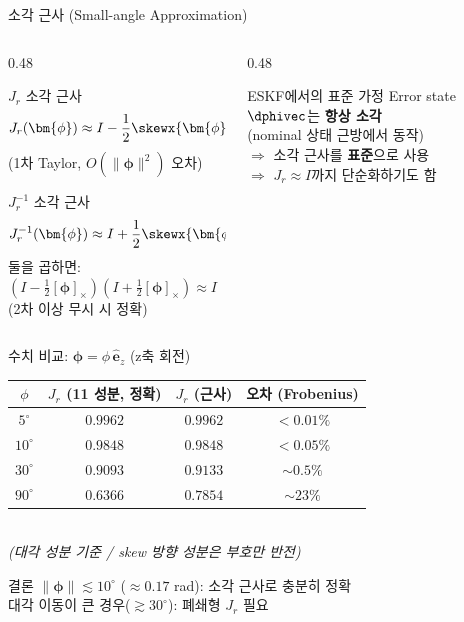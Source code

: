 \begin{frame}[shrink=25]{소각 근사 (Small-angle Approximation)}
  \begin{columns}[T]
    \begin{column}{0.48\textwidth}
      \begin{block}{$J_r$ 소각 근사}
        \[
          J_r(\bm{\phi}) \approx I - \frac{1}{2}\skewx{\bm{\phi}}
        \]
        (1차 Taylor, $O(\|\bm{\phi}\|^2)$ 오차)
      \end{block}
      \begin{block}{$J_r^{-1}$ 소각 근사}
        \[
          J_r^{-1}(\bm{\phi}) \approx I + \frac{1}{2}\skewx{\bm{\phi}}
        \]
        둘을 곱하면: $(I - \tfrac{1}{2}[\bm{\phi}]_\times)(I + \tfrac{1}{2}[\bm{\phi}]_\times) \approx I$\\
        (2차 이상 무시 시 정확)
      \end{block}
    \end{column}
    \begin{column}{0.48\textwidth}
      \begin{alertblock}{ESKF에서의 표준 가정}
        Error state $\dphivec$는 \textbf{항상 소각}\\
        (nominal 상태 근방에서 동작)\\
        \medskip
        $\Rightarrow$ 소각 근사를 \textbf{표준}으로 사용\\
        $\Rightarrow$ $J_r \approx I$까지 단순화하기도 함
      \end{alertblock}
    \end{column}
  \end{columns}
  \pause
  \vspace{0.5em}
  \begin{block}{\footnotesize 수치 비교: $\bm{\phi} = \phi\,\hat{\bm{e}}_z$ (z축 회전)}
    \centering
    \footnotesize
    \begin{tabular}{c|cc|c}
      \hline
      $\phi$ & $J_r$ (11 성분, 정확) & $J_r$ (근사) & 오차 (Frobenius) \\
      \hline
      $5^\circ$  & $0.9962$ & $0.9962$ & $<0.01\%$ \\
      $10^\circ$ & $0.9848$ & $0.9848$ & $<0.05\%$ \\
      $30^\circ$ & $0.9093$ & $0.9133$ & $\sim 0.5\%$ \\
      $90^\circ$ & $0.6366$ & $0.7854$ & $\sim 23\%$ \\
      \hline
    \end{tabular}
    \medskip\\
    \textit{(대각 성분 기준 / skew 방향 성분은 부호만 반전)}
  \end{block}
  \pause
  \begin{exampleblock}{결론}
    $\|\bm{\phi}\| \lesssim 10^\circ$ ($\approx 0.17$ rad): 소각 근사로 충분히 정확\\
    대각 이동이 큰 경우($\gtrsim 30^\circ$): 폐쇄형 $J_r$ 필요
  \end{exampleblock}
\end{frame}



